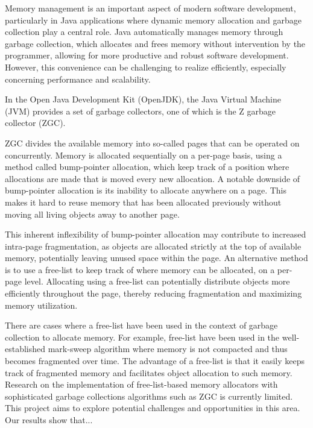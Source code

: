
Memory management is an important aspect of modern software development, particularly in Java applications where dynamic memory allocation and garbage collection play a central role. Java automatically manages memory through garbage collection, which allocates and frees memory without intervention by the programmer, allowing for more productive and robust software development. However, this convenience can be challenging to realize efficiently, especially concerning performance and scalability. 

In the Open Java Development Kit (OpenJDK), the Java Virtual Machine (JVM) provides a set of garbage collectors, one of which is the Z garbage collector (ZGC). 

ZGC divides the available memory into so-called pages that can be operated on concurrently. Memory is allocated sequentially on a per-page basis, using a method called bump-pointer allocation, which keep track of a position where allocations are made that is moved every new allocation. A notable downside of bump-pointer allocation is its inability to allocate anywhere on a page. This makes it hard to reuse memory that has been allocated previously without moving all living objects away to another page. 

This inherent inflexibility of bump-pointer allocation may contribute to increased intra-page fragmentation, as objects are allocated strictly at the top of available memory, potentially leaving unused space within the page. An alternative method is to use a free-list to keep track of where memory can be allocated, on a per-page level. Allocating using a free-list can potentially distribute objects more efficiently throughout the page, thereby reducing fragmentation and maximizing memory utilization.

There are cases where a free-list have been used in the context of garbage collection to allocate memory. For example, free-list have been used in the well-established mark-sweep algorithm where memory is not compacted and thus becomes fragmented over time. The advantage of a free-list is that it easily keeps track of fragmented memory and facilitates object allocation to such memory. Research on the implementation of free-list-based memory allocators with sophisticated garbage collections algorithms such as ZGC is currently limited. This project aims to explore potential challenges and opportunities in this area. Our results show that...



